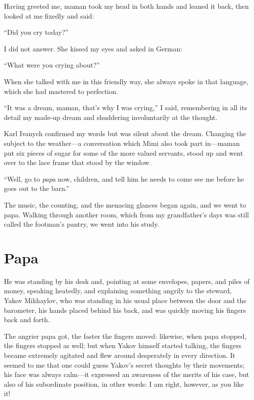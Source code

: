 Having greeted me, maman took my head in both hands and leaned it back, then looked at me fixedly and said:

``Did you cry today?'' %

I did not answer. She kissed my eyes and asked in German:

``What were you crying about?'' %

When she talked with me in this friendly way, she always spoke in that language, which she had mastered to perfection.

``It was a dream, maman, that's why I was crying,'' I said, remembering in all its detail my made-up dream and shuddering involuntarily at the thought. %

Karl Ivanych confirmed my words but was silent about the dream. Changing the subject to the weather---a conversation which Mimi also took part in---maman put six pieces of sugar for some of the more valued servants, stood up and went over to the lace frame that stood by the window.

``Well, go to \textit{papa} now, children, and tell him he needs to come see me before he goes out to the barn.'' %

The music, the counting, and the menacing glances began again, and we went to papa. Walking through another room, which from my grandfather's days was still called the footman's pantry, we went into his study.

\chapter{Papa} %

He was standing by his desk and, pointing at some envelopes, papers, and piles of money, speaking heatedly, and explaining something angrily to the steward, Yakov Mikhaylov, who was standing in his usual place between the door and the barometer, his hands placed behind his back, and was quickly moving his fingers back and forth.

The angrier papa got, the faster the fingers moved: likewise, when papa stopped, the fingers stopped as well; but when Yakov himself started talking, the fingers became extremely agitated and flew around desperately in every direction. It seemed to me that one could guess Yakov's secret thoughts by their movements; his face was always calm---it expressed an awareness of the merits of his case, but also of his subordinate position, in other words: I am right, however, as you like it!

